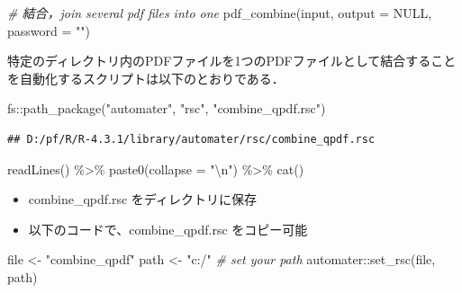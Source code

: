 \documentclass[
]{article}
\newenvironment{Shaded}{\begin{snugshade}}{\end{snugshade}}
\newcommand{\AttributeTok}[1]{\textcolor[rgb]{0.77,0.63,0.00}{#1}}
\newcommand{\CommentTok}[1]{\textcolor[rgb]{0.56,0.35,0.01}{\textit{#1}}}
\newcommand{\ConstantTok}[1]{\textcolor[rgb]{0.00,0.00,0.00}{#1}}
\newcommand{\FunctionTok}[1]{\textcolor[rgb]{0.00,0.00,0.00}{#1}}
\newcommand{\NormalTok}[1]{#1}
\newcommand{\OtherTok}[1]{\textcolor[rgb]{0.56,0.35,0.01}{#1}}
\newcommand{\SpecialCharTok}[1]{\textcolor[rgb]{0.00,0.00,0.00}{#1}}
\newcommand{\StringTok}[1]{\textcolor[rgb]{0.31,0.60,0.02}{#1}}
\providecommand{\tightlist}{%
  \setlength{\itemsep}{0pt}\setlength{\parskip}{0pt}}
\begin{document}
\begin{Shaded}
\begin{Highlighting}[]
  \CommentTok{\# 結合，join several pdf files into one}
\FunctionTok{pdf\_combine}\NormalTok{(input, }\AttributeTok{output =} \ConstantTok{NULL}\NormalTok{, }\AttributeTok{password =} \StringTok{""}\NormalTok{)}
\end{Highlighting}
\end{Shaded}

特定のディレクトリ内のPDFファイルを1つのPDFファイルとして結合することを自動化するスクリプトは以下のとおりである．

\begin{Shaded}
\begin{Highlighting}[]
\NormalTok{fs}\SpecialCharTok{::}\FunctionTok{path\_package}\NormalTok{(}\StringTok{"automater"}\NormalTok{, }\StringTok{"rsc"}\NormalTok{, }\StringTok{"combine\_qpdf.rsc"}\NormalTok{)}
\end{Highlighting}
\end{Shaded}

\begin{verbatim}
## D:/pf/R/R-4.3.1/library/automater/rsc/combine_qpdf.rsc
\end{verbatim}

\begin{Shaded}
\begin{Highlighting}[]
  \FunctionTok{readLines}\NormalTok{() }\SpecialCharTok{\%\textgreater{}\%}
  \FunctionTok{paste0}\NormalTok{(}\AttributeTok{collapse =} \StringTok{"}\SpecialCharTok{\textbackslash{}n}\StringTok{"}\NormalTok{) }\SpecialCharTok{\%\textgreater{}\%}
  \FunctionTok{cat}\NormalTok{()}
\end{Highlighting}
\end{Shaded}

\begin{itemize}
\tightlist
\item
  combine\_qpdf.rsc をディレクトリに保存\\
\item
  以下のコードで、combine\_qpdf.rsc をコピー可能
\end{itemize}

\begin{Shaded}
\begin{Highlighting}[]
\NormalTok{file }\OtherTok{\textless{}{-}} \StringTok{"combine\_qpdf"}
\NormalTok{path }\OtherTok{\textless{}{-}} \StringTok{"c:/"} \CommentTok{\# set your path}
\NormalTok{automater}\SpecialCharTok{::}\FunctionTok{set\_rsc}\NormalTok{(file, path)}
\end{Highlighting}
\end{Shaded}
\end{document}
